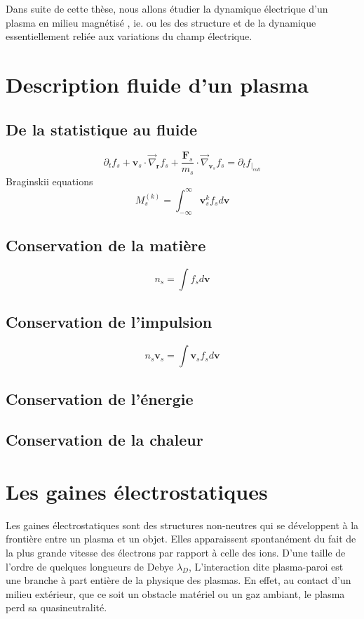			
			
			Dans suite de cette thèse, nous allons étudier la dynamique électrique d'un plasma en milieu magnétisé
			, ie. ou les 
			des structure et de la dynamique essentiellement reliée aux variations du champ électrique.
	\section{Description fluide d'un plasma}
		
		\subsection{De la statistique au fluide}
			$$\partial_tf_s+\mathbf{v}_s\cdot\vec\nabla_\mathbf{r}f_s+\frac{\mathbf{F}_s}{m_s}\cdot\vec\nabla_{\mathbf{v}_s}f_s=\partial_tf_{|_{coll}}$$
			Braginskii equations
			$$M^{(k)}_s=\int_{-\infty}^{\infty}\mathbf{v}_s^kf_sd\mathbf{v}$$
		\subsection{Conservation de la matière}
			$$n_s=\int f_sd\mathbf{v}$$
			
		\subsection{Conservation de l'impulsion}
			$$n_s\mathbf{v}_s=\int \mathbf{v}_sf_sd\mathbf{v}$$
		\subsection{Conservation de l'énergie}
		\subsection{Conservation de la chaleur}
	\section{Les gaines électrostatiques}
			Les gaines électrostatiques sont des structures non-neutres qui se
			développent à la frontière entre un plasma et un objet. Elles apparaissent
			spontanément du fait de la plus grande vitesse des électrons par rapport à
			celle des ions. D'une taille de l'ordre de quelques longueurs de Debye $\lambda_D$, 
			L'interaction dite plasma-paroi est une branche à part entière de la physique des plasmas.
			En effet, au contact d'un milieu extérieur, que ce soit un obstacle matériel
			ou un gaz ambiant, le plasma perd sa quasineutralité.
